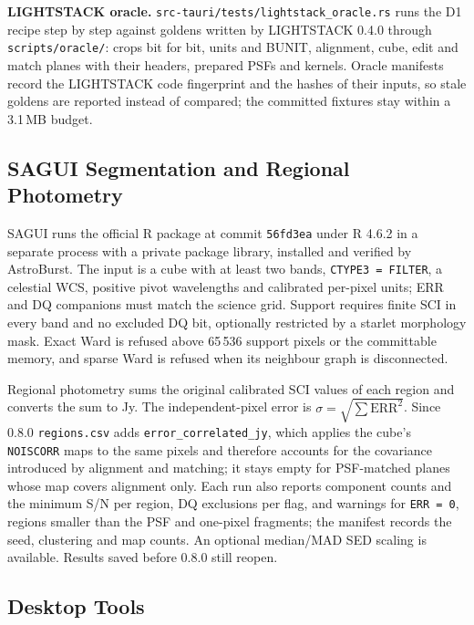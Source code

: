 \documentclass[11pt,a4paper]{article}
\newcommand{\code}[1]{\texttt{\small #1}}
\begin{document}
    \textbf{LIGHTSTACK oracle.} \code{src-tauri/tests/lightstack\_oracle.rs} runs the D1 recipe step by step against goldens written by LIGHTSTACK 0.4.0 through \code{scripts/oracle/}: crops bit for bit, units and BUNIT, alignment, cube, edit and match planes with their headers, prepared PSFs and kernels. Oracle manifests record the LIGHTSTACK code fingerprint and the hashes of their inputs, so stale goldens are reported instead of compared; the committed fixtures stay within a 3.1\,MB budget.

    \subsection{SAGUI Segmentation and Regional Photometry}
    \label{sec:sagui}

    SAGUI runs the official R package at commit \code{56fd3ea} under R 4.6.2 in a separate process with a private package library, installed and verified by AstroBurst. The input is a cube with at least two bands, \code{CTYPE3 = FILTER}, a celestial WCS, positive pivot wavelengths and calibrated per-pixel units; ERR and DQ companions must match the science grid. Support requires finite SCI in every band and no excluded DQ bit, optionally restricted by a starlet morphology mask. Exact Ward is refused above 65\,536 support pixels or the committable memory, and sparse Ward is refused when its neighbour graph is disconnected.

    Regional photometry sums the original calibrated SCI values of each region and converts the sum to Jy. The independent-pixel error is $\sigma = \sqrt{\sum \mathrm{ERR}^2}$. Since 0.8.0 \code{regions.csv} adds \code{error\_correlated\_jy}, which applies the cube's \code{NOISCORR} maps to the same pixels and therefore accounts for the covariance introduced by alignment and matching; it stays empty for PSF-matched planes whose map covers alignment only. Each run also reports component counts and the minimum S/N per region, DQ exclusions per flag, and warnings for \code{ERR = 0}, regions smaller than the PSF and one-pixel fragments; the manifest records the seed, clustering and map counts. An optional median/MAD SED scaling is available. Results saved before 0.8.0 still reopen.

    \subsection{Desktop Tools}
    \label{sec:desktop_cubeprep}
\end{document}
